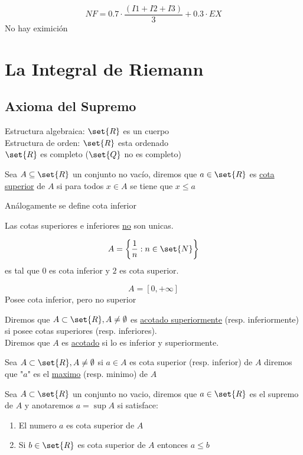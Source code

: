 \documentclass[11pt]{book}
\begin{document}
\[
	NF = 0.7\cdot\frac{(I1+I2+I3)}{3}+0.3\cdot EX
\]
No hay eximición
\tableofcontents
{}

\part{La Integral de Riemann}
\chapter{Axioma del Supremo}
 {\raggedleft Estructura algebraica: $\set{R}$ es un cuerpo}\\
Estructura de orden: $\set{R}$ esta ordenado\\
$\set{R}$ es completo ($\set{Q}$ no es completo)\\
\begin{defn}
	Sea $A\subseteq\set{R}$ un conjunto no vacío, diremos que $a\in\set{R}$ es \underline{cota superior} de $A$ si para todos $x\in A$ se tiene que $x\leq a$
\end{defn}
\begin{defn}
	Análogamente se define cota inferior
\end{defn}
\begin{obs}
	Las cotas superiores e inferiores \underline{no} son unicas.
\end{obs}
\begin{ejm}
	\[A=\left\{\frac{1}{n}:n\in\set{N}\right\}\]
	es tal que $0$ es cota inferior y $2$ es cota superior.
\end{ejm}
\begin{ejm}
	\[A=[0,+\infty]\]
	Posee cota inferior, pero no superior
\end{ejm}
\begin{defn}
	Diremos que $A\subset\set{R},A\neq\emptyset$ es \underline{acotado superiormente} (resp. inferiormente) si posee cotas superiores (resp. inferiores).\\
	Diremos que $A$ es \underline{acotado} si lo es inferior y superiormente.
\end{defn}
\begin{defn}
	Sea $A\subset\set{R},A\neq\emptyset$ si $a\in A$ es cota superior (resp. inferior) de $A$ diremos que "$a$" es el \underline{maximo} (resp. minimo) de $A$
\end{defn}
\begin{defn}[Supremo]
	Sea $A\subset\set{R}$ un conjunto no vacio, diremos que $a\in\set{R}$ es el supremo de $A$ y anotaremos $a=\sup A$ si satisface:
	\begin{enumerate}
		\item El numero $a$ es cota superior de $A$

		\item Si $b\in\set{R}$ es cota superior de $A$ entonces $a\leq b$
	\end{enumerate}
\end{defn}
\end{document}
